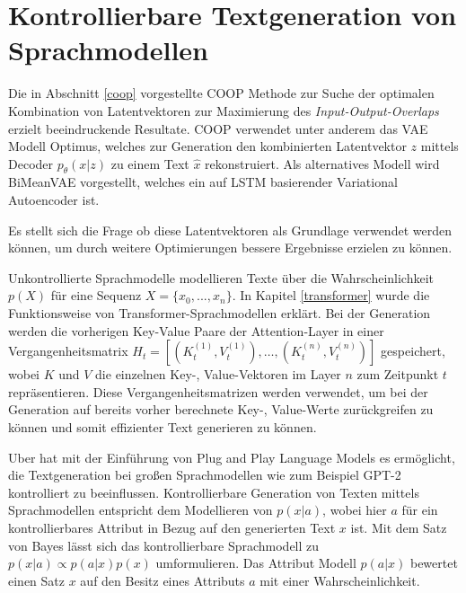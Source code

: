 \section{Kontrollierbare Textgeneration von Sprachmodellen}\raggedbottom
Die in Abschnitt \ref{coop} vorgestellte COOP Methode zur Suche der optimalen Kombination von Latentvektoren zur Maximierung des \textit{Input-Output-Overlaps} erzielt beeindruckende Resultate.
COOP verwendet unter anderem das VAE Modell Optimus, welches zur Generation den kombinierten Latentvektor $z$ mittels Decoder $p_\theta(x|z)$ zu einem Text $\hat{x}$ rekonstruiert.
Als alternatives Modell wird BiMeanVAE vorgestellt, welches ein auf LSTM basierender Variational Autoencoder ist.

Es stellt sich die Frage ob diese Latentvektoren als Grundlage verwendet werden können, um durch weitere Optimierungen bessere Ergebnisse erzielen zu können.

Unkontrollierte Sprachmodelle modellieren Texte über die Wahrscheinlichkeit $p(X)$ für eine Sequenz $X=\{x_0,...,x_n\}$.
In Kapitel \ref{transformer} wurde die Funktionsweise von Transformer-Sprachmodellen erklärt. 
Bei der Generation werden die vorherigen Key-Value Paare der Attention-Layer in einer Vergangenheitsmatrix $H_t = [(K_t^{(1)},V_t^{(1)}), \ldots , (K_t^{(n)},V_t^{(n)})]$ gespeichert, wobei $K$ und $V$ die einzelnen Key-, Value-Vektoren im Layer $n$ zum Zeitpunkt $t$ repräsentieren. %
Diese Vergangenheitsmatrizen werden verwendet, um bei der Generation auf bereits vorher berechnete Key-, Value-Werte zurückgreifen zu können und somit effizienter Text generieren zu können.


Uber hat mit der Einführung von Plug and Play Language Models \citep{DBLP:journals/corr/abs-1912-02164} es ermöglicht, die Textgeneration bei großen Sprachmodellen wie zum Beispiel GPT-2 kontrolliert zu beeinflussen.
Kontrollierbare Generation von Texten mittels Sprachmodellen entspricht dem Modellieren von $p(x|a)$, wobei hier $a$ für ein kontrollierbares Attribut in Bezug auf den generierten Text $x$ ist. 
Mit dem Satz von Bayes lässt sich das kontrollierbare Sprachmodell zu $p(x|a)\propto p(a|x)p(x)$ umformulieren. 
Das Attribut Modell $p(a|x)$ bewertet einen Satz $x$ auf den Besitz eines Attributs $a$ mit einer Wahrscheinlichkeit.


